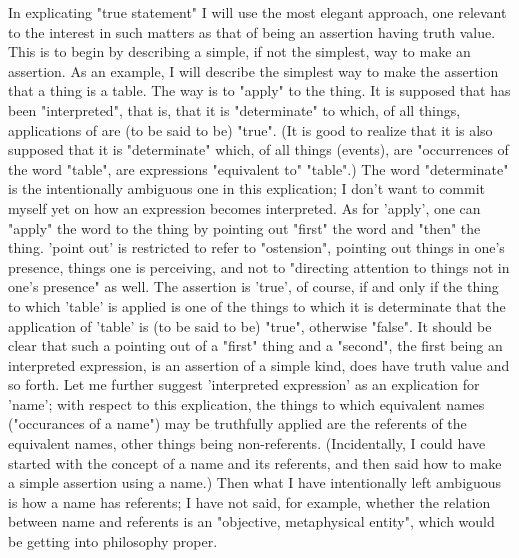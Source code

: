 \documentclass[10pt,twoside]{memoir}
\begin{document}
\begin{enumerate}
In explicating "true statement" I will use the most elegant approach, one 
relevant to the interest in such matters as that of being an assertion having 
truth value. This is to begin by describing a simple, if not the simplest, way 
to make an assertion. As an example, I will describe the simplest way to 
make the assertion that a thing is a table. The way is to "apply"  to 
the thing. It is supposed that  has been "interpreted", that is, that it is 
"determinate" to which, of all things, applications of  are (to be said 
to be) "true". (It is good to realize that it is also supposed that it is 
"determinate" which, of all things (events), are "occurrences of the word 
"table", are expressions "equivalent to" "table".) The word "determinate" is 
the intentionally ambiguous one in this explication; I don't want to commit 
myself yet on how an expression becomes interpreted. As for 'apply', one 
can "apply" the word to the thing by pointing out "first" the word and 
"then" the thing. 'point out' is restricted to refer to "ostension", pointing 
out things in one's presence, things one is perceiving, and not to "directing 
attention to things not in one's presence" as well. The assertion is 'true', of 
course, if and only if the thing to which 'table' is applied is one of the things 
to which it is determinate that the application of 'table' is (to be said to be) 
"true", otherwise "false". It should be clear that such a pointing out of a 
"first" thing and a "second", the first being an interpreted expression, is an 
assertion of a simple kind, does have truth value and so forth. Let me further 
suggest 'interpreted expression' as an explication for 'name'; with respect to 
this explication, the things to which equivalent names ("occurances of a 
name") may be truthfully applied are the referents of the equivalent names, 
other things being non-referents. (Incidentally, I could have started with the 
concept of a name and its referents, and then said how to make a simple 
assertion using a name.) Then what I have intentionally left ambiguous is 
how a name has referents; I have not said, for example, whether the relation 
between name and referents is an "objective, metaphysical entity", which 
would be getting into philosophy proper. 


\end{enumerate}
\end{document}

